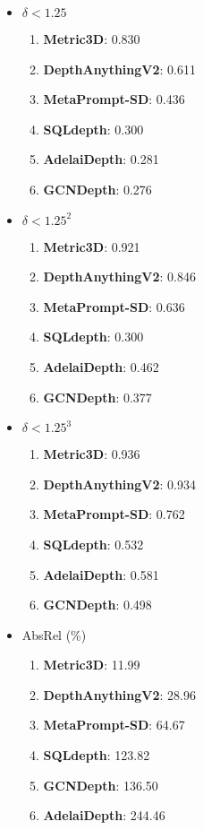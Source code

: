 \begin{itemize}
    \item $\delta < 1.25$
    \begin{enumerate}
        \item \textbf{Metric3D}: 0.830
        \item \textbf{DepthAnythingV2}: 0.611
        \item \textbf{MetaPrompt-SD}: 0.436
        \item \textbf{SQLdepth}: 0.300
        \item \textbf{AdelaiDepth}: 0.281
        \item \textbf{GCNDepth}: 0.276
    \end{enumerate}

    \item $\delta < 1.25^2$
    \begin{enumerate}
        \item \textbf{Metric3D}: 0.921
        \item \textbf{DepthAnythingV2}: 0.846
        \item \textbf{MetaPrompt-SD}: 0.636
        \item \textbf{SQLdepth}: 0.300
        \item \textbf{AdelaiDepth}: 0.462
        \item \textbf{GCNDepth}: 0.377
    \end{enumerate}

    \item $\delta < 1.25^3$
    \begin{enumerate}
        \item \textbf{Metric3D}: 0.936
        \item \textbf{DepthAnythingV2}: 0.934
        \item \textbf{MetaPrompt-SD}: 0.762
        \item \textbf{SQLdepth}: 0.532
        \item \textbf{AdelaiDepth}: 0.581
        \item \textbf{GCNDepth}: 0.498
    \end{enumerate}

    \item AbsRel (\%)
    \begin{enumerate}
        \item \textbf{Metric3D}: 11.99
        \item \textbf{DepthAnythingV2}: 28.96
        \item \textbf{MetaPrompt-SD}: 64.67
        \item \textbf{SQLdepth}: 123.82
        \item \textbf{GCNDepth}: 136.50
        \item \textbf{AdelaiDepth}: 244.46
    \end{enumerate}


\end{itemize}
